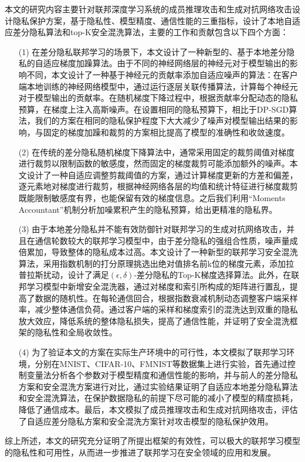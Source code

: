 本文的研究内容主要针对联邦深度学习系统的成员推理攻击和生成对抗网络攻击设计隐私保护方案，基于隐私性、模型精度、通信性能的三重指标，设计了本地自适应差分隐私算法和top-K安全混洗算法，主要的工作和贡献包含以下四个方面：
\begin{enumerate}
\item [(1)] 在差分隐私联邦学习的场景下，本文设计了一种新型的、基于本地差分隐私的自适应梯度加躁算法。由于不同的神经网络层的神经元对于模型输出的影响不同，本文设计了一种基于神经元的贡献率添加自适应噪声的算法：在客户端本地训练的神经网络模型中，通过运行逐层关联传播算法，计算每个神经元对于模型输出的贡献率。在随机梯度下降过程中，根据贡献率分配动态的隐私预算，在梯度上注入高斯噪声。在设置相同的隐私预算下，相比于DP-SGD算法，我们的方案在相同的隐私保护程度下大大减少了噪声对模型输出结果的影响，与固定的梯度加躁和裁剪的方案相比提高了模型的准确性和收敛速度。

\item [(2)]在传统的差分隐私随机梯度下降算法中，通常采用固定的裁剪阈值对梯度进行裁剪以限制函数的敏感度，然而固定的梯度裁剪可能添加额外的噪声。本文设计了一种自适应调整剪裁阈值的方案，通过计算梯度更新的方差和偏差，逐元素地对梯度进行裁剪，根据神经网络各层的均值和统计特征进行梯度裁剪既能限制敏感度有界，也能保留有效的梯度信息。之后我们利用“Moments Accountant”机制分析加噪累积产生的隐私预算，给出更精准的隐私界。

\item [(3)]由于本地差分隐私并不能有效防御针对联邦学习的生成对抗网络攻击，并且在通信轮数较大的联邦学习模型中，由于差分隐私的强组合性质，噪声量成倍累加，导致整体的隐私成本过高。本文设计了一种新型的联邦学习安全混洗算法，采用指数机制的打分原理挑选出绝对值排名前k位的梯度元素，添加拉普拉斯扰动，设计了满足$(\epsilon, \delta)$-差分隐私的Top-K梯度选择算法。此外，在联邦学习模型中新增安全混洗器，通过对梯度和索引所构成的矩阵进行置乱，提高了数据的随机性。在每轮通信回合，根据指数衰减机制动态调整客户端采样率，减少整体通信负荷。通过客户端的采样和梯度索引的混洗达到双重的隐私放大效应，降低系统的整体隐私损失，提高了通信性能，并证明了安全混洗框架的隐私性和全局收敛性。

\item [(4)]为了验证本文的方案在实际生产环境中的可行性，本文模拟了联邦学习环境，分别在MNIST、CIFAR-10、FMNIST等数据集上进行实验，首先通过控制变量法分析各个参数对于模型精度和通信性能的影响，并与前人的差分隐私方案和安全混洗方案进行对比，通过实验结果证明了自适应本地差分隐私算法和安全混洗算法，在保护数据隐私的前提下尽可能的减小了模型的精度损耗，降低了通信成本。最后，本文模拟了成员推理攻击和生成对抗网络攻击，评估了自适应差分隐私方案和安全混洗方案针对攻击模型的隐私保护效用。

\end{enumerate}
综上所述，本文的研究充分证明了所提出框架的有效性，可以极大的联邦学习模型的隐私性和可用性，从而进一步推进了联邦学习在安全领域的应用和发展。

